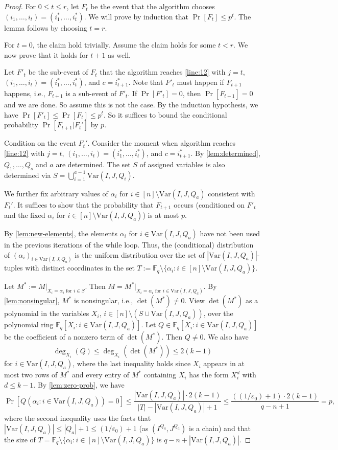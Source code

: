 \documentclass[11pt]{article}
\theoremstyle{plain}
\theoremstyle{definition}
\theoremstyle{remark}
\newcommand{\eps}{\varepsilon}
\newcommand{\var}{\mathrm{Var}}
\newcommand{\Fq}{\mathbb{F}_q}
\begin{document}
\begin{proof}
For $0\leq t\leq r$, let $F_{t}$ be the event that the algorithm chooses $(i_1,\dots,i_t)=(i_1^*,\dots,i_{t}^*)$. 
We will prove by induction that $\Pr[F_t]\leq p^{t}$. The lemma follows by choosing $t=r$.

For $t=0$, the claim hold trivially. Assume the claim holds for some $t<r$. We now prove that it holds for $t+1$ as well.


Let $F'_t$ be the sub-event of $F_t$ that the algorithm reaches \cref{line:12} with $j=t$, $(i_1,\dots,i_t)=(i^*_1,\dots,i^*_t)$, and $c=i^*_{t+1}$.
Note that $F'_t$ must happen if $F_{t+1}$ happens, i.e., $F_{t+1}$ is a sub-event of $F'_t$. 
If $\Pr[F'_t]=0$, then $\Pr[F_{t+1}]=0$ and we are done. So assume this is not the case.
By the induction hypothesis, we have $\Pr[F'_t]\leq \Pr[F_t]\leq p^{t}$.
So it suffices to bound the conditional probability $\Pr[F_{t+1}|F_t']$ by $p$.

Condition on the event $F_t'$. Consider the moment when algorithm reaches \cref{line:12} with $j=t$, $(i_1,\dots,i_t)=(i^*_1,\dots,i^*_t)$, and $c=i^*_{t+1}$.
By \cref{lem:determined}, $Q_1,\dots,Q_s$ and $a$ are determined.
The set $S$ of assigned variables
is also determined via $S=\bigcup_{i=1}^{a-1} \var(I,J, Q_i)$.



We further fix arbitrary values of $\alpha_i$ for $i\in [n]\setminus \var(I,J,Q_a)$ consistent with $F_t'$.
It suffices to show that the probability that $F_{t+1}$ occurs (conditioned on $F'_t$ and the fixed $\alpha_i$ for $i\in [n]\setminus \var(I,J,Q_a)$) is at most $p$.

By \cref{lem:new-elements}, the elements $\alpha_i$ for $i\in \var(I,J,Q_a)$ have not been used in the previous iterations of the while loop.
Thus, the (conditional) distribution of $(\alpha_i)_{i\in\var(I,J,Q_a)}$ is the uniform distribution over the set of $|\var(I,J,Q_a)|$-tuples with distinct coordinates in the set $T:=\Fq\setminus \{\alpha_i: i\in [n]\setminus \var(I,J,Q_a)\}$. 

Let $M^*:=M|_{X_i=\alpha_i \text{ for } i\in S}$.
Then $\overline{M}=M^*|_{X_i=\alpha_i \text{ for } i\in \var(I,J,Q_a)}$.
By \cref{lem:nonsingular}, $M^*$ is nonsingular, i.e., $\det(M^*)\neq 0$.
View $\det(M^*)$ as a polynomial in the variables $X_i$, $i\in [n]\setminus (S\cup \var(I,J,Q_a))$, over the polynomial ring $\Fq[X_i: i\in \var(I,J,Q_a)]$. Let $Q\in \Fq[X_i: i\in \var(I,J,Q_a)]$ be the coefficient of a nonzero term of $\det(M^*)$. Then $Q\neq 0$. We also have 
\[
\deg_{X_i}(Q)\leq \deg_{X_i}(\det(M^*))\leq 2(k-1)
\]
for $i\in \var(I,J,Q_a)$, where the last inequality holds since $X_i$ appears in at most two rows of $M^*$ and every entry of $M^*$ containing $X_i$ has the form $X_i^d$ with $d\leq k-1$. By \cref{lem:zero-prob}, we have 
\[
\Pr[Q(\alpha_i: i\in \var(I,J,Q_a))=0]\leq \frac{|\var(I,J,Q_a)|\cdot 2(k-1)}{|T|-|\var(I,J,Q_a)|+1}
\leq \frac{((1/\eps_0)+1)\cdot 2(k-1)}{q-n+1}=p,
\]
where the second inequality uses the facts that $|\var(I,J,Q_a)|\leq |Q_a|+1\leq (1/\eps_0)+1$ (as $(I^{Q_a},J^{Q_a})$ is a chain) and that the size of $T=\Fq\setminus \{\alpha_i: i\in [n]\setminus \var(I,J,Q_a)\}$ is $q-n+|\var(I,J,Q_a)|$.


\end{proof}
\end{document}

